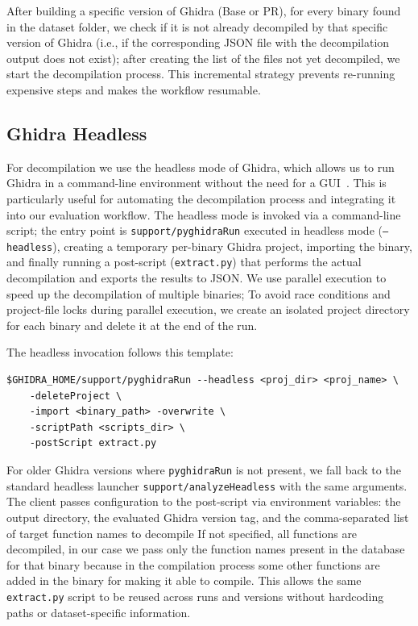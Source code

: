 After building a specific version of Ghidra (Base or \ac{PR}), for every binary found in the dataset folder, we check if it is not already decompiled by that specific version of Ghidra (i.e., if the corresponding \ac{JSON} file with the decompilation output does not exist);
after creating the list of the files not yet decompiled, we start the decompilation process. This incremental strategy prevents re-running expensive steps and makes the workflow resumable.

\subsection{Ghidra Headless}

For decompilation we use the headless mode of Ghidra, which allows us to run Ghidra in a command-line environment without the need for a \ac{GUI}~\cite{site:githubGhidraGhidraRuntimeScriptsCommonsupportanalyzeHeadlessREADMEmdMaster}.
This is particularly useful for automating the decompilation process and integrating it into our evaluation workflow.
The headless mode is invoked via a command-line script; 
the entry point is \texttt{support/pyghidraRun} executed in headless mode (\texttt{--headless}), creating a temporary per-binary Ghidra project, importing the binary, and finally running a post-script (\texttt{extract.py}) that performs the actual decompilation and exports the results to \ac{JSON}.
We use parallel execution to speed up the decompilation of multiple binaries; To avoid race conditions and project-file locks during parallel execution, we create an isolated project directory for each binary and delete it at the end of the run.

The headless invocation follows this template:

\begin{verbatim}
$GHIDRA_HOME/support/pyghidraRun --headless <proj_dir> <proj_name> \
    -deleteProject \
    -import <binary_path> -overwrite \
    -scriptPath <scripts_dir> \
    -postScript extract.py
\end{verbatim}

For older Ghidra versions where \texttt{pyghidraRun} is not present, we fall back to the standard headless launcher \texttt{support/analyzeHeadless} with the same arguments.
The client passes configuration to the post-script via environment variables: the output directory, the evaluated Ghidra version tag, and the comma-separated list of target function names to decompile 
If not specified, all functions are decompiled, in our case we pass only the function names present in the database for that binary because in the compilation process some other functions are added in 
the binary for making it able to compile. This allows the same \texttt{extract.py} script to be reused across runs and versions without hardcoding paths or dataset-specific information.



